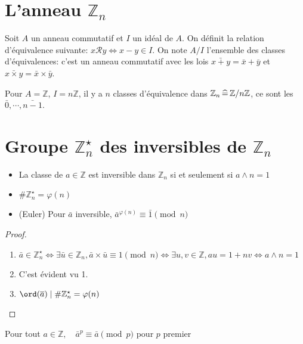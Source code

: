 
\section{L'anneau $\mathbb Z_n$}

Soit $A$ un anneau commutatif et $I$ un idéal de $A$. On définit la relation d'équivalence suivante: $x\mathcal Ry\iff x-y\in I$. On note $A/I$ l'ensemble des classes d'équivalences: c'est un anneau commutatif avec les lois $\bar{x+y}=\bar x+\bar y$ et $\bar{x\times y}=\bar x\times \bar y$.

Pour $A=\mathbb Z$, $I=n\mathbb Z$, il y a $n$ classes d'équivalence dans $\mathbb Z_n\,\widehat=\,\mathbb Z/n\mathbb Z$, ce sont les $\bar 0, \cdots , \bar{n-1}$.

\section{Groupe $\mathbb Z_n^\star$ des inversibles de $\mathbb Z_n$}

\begin{prop}
    \begin{itemize}
        \item La classe de $a\in\mathbb Z$ est inversible dans $\mathbb Z_n$ si et seulement si $a\land n=1$
        \item $\#\mathbb Z_n^\star=\varphi(n)$
        \item (Euler) Pour $\bar a$ inversible, $\bar a^{\varphi(n)}\equiv \bar 1\pmod n$
    \end{itemize}
\end{prop}

\begin{proof}~
    \begin{enumerate}
        \item $\bar a\in\mathbb Z_n^\star\iff \exists \bar u\in\mathbb Z_n, \bar a\times \bar u\equiv 1\pmod n\iff \exists u, v\in\mathbb Z, au=1+nv \iff a\land n=1$
        \item C'est évident vu 1.
        \item $\ord(\bar a)\;|\;\#\mathbb Z_n^\star=\varphi(n)$
    \end{enumerate}
\end{proof}

\begin{cor}
     Pour tout $a\in\mathbb Z, \quad \bar a^p\equiv \bar a\pmod p$ pour $p$ premier
\end{cor}

